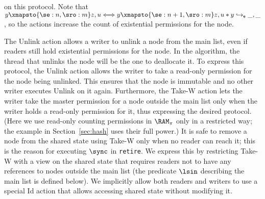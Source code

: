 on this protocol.  Note that $y \xmapsto{\se: n,\sro:m} z,u \Longleftrightarrow
y \xmapsto{\se:n+1,\sro:m} z,u * y \hookrightarrow_{\sf e} \_,\_$, so the
actions increase the count of existential permissions for the node.

The \textsf{Unlink} action allows a writer to unlink a node from the main list,
even if readers still hold existential permissions for the node. In the
algorithm, the thread that unlinks the node will be the one to deallocate it. To
express this protocol, the \textsf{Unlink} action allows the writer to take a
read-only permission for the node being unlinked. This ensures that the node is
immutable and no other writer executes \textsf{Unlink} on it again.
Furthermore, the \textsf{Take-W} action lets the writer take the master
permission for a node outside the main list only when the writer holds a
read-only permission for it, thus expressing the desired protocol.  (Here
we use read-only counting permissions in $\RAM_{\pi}$ only in a restricted way;
the example in Section~\ref{sec:hash} uses their full power.) It is safe to
remove a node from the shared state using \textsf{Take-W} only when no reader
can reach it; this is the reason for executing $\sync$ in {\tt retire}. We
express this by restricting \textsf{Take-W} with a view on the shared state that
requires readers not to have any references to nodes outside the main list (the
predicate $\lsin$ describing the main list is defined below).  We implicitly
allow both readers and writers to use a special \textsf{Id} action that allows
accessing shared state without modifying it.

